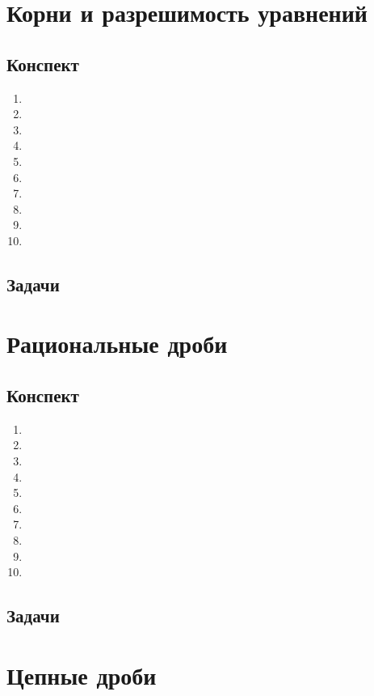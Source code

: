 \section{Корни и разрешимость уравнений}

\subsection{Конспект}
\begin{enumerate}\setlength{\itemsep}{1pt}
\item 
\item 
\item 
\item 
\item 
\item 
\item 
\item 
\item 
\item 
\end{enumerate}
\subsection{Задачи}


\section{Рациональные дроби}

\subsection{Конспект}
\begin{enumerate}\setlength{\itemsep}{1pt}
\item 
\item 
\item 
\item 
\item 
\item 
\item 
\item 
\item 
\item 
\end{enumerate}
\subsection{Задачи}



\section{Цепные дроби}


